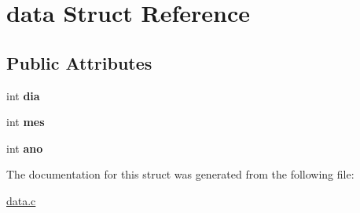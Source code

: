 \hypertarget{structdata}{}\section{data Struct Reference}
\label{structdata}
\subsection*{Public Attributes}
\begin{DoxyCompactItemize}
\item 
int {\bfseries dia}\hypertarget{structdata_ac514ae966b758141957f8254bdd7850b}{}\label{structdata_ac514ae966b758141957f8254bdd7850b}

\item 
int {\bfseries mes}\hypertarget{structdata_ad0f682acbc0199c05dc584f887f580a1}{}\label{structdata_ad0f682acbc0199c05dc584f887f580a1}

\item 
int {\bfseries ano}\hypertarget{structdata_a2898507d44bff1cd51afb7dd562d2378}{}\label{structdata_a2898507d44bff1cd51afb7dd562d2378}

\end{DoxyCompactItemize}


The documentation for this struct was generated from the following file\+:\begin{DoxyCompactItemize}
\item 
\hyperlink{data_8c}{data.\+c}\end{DoxyCompactItemize}
